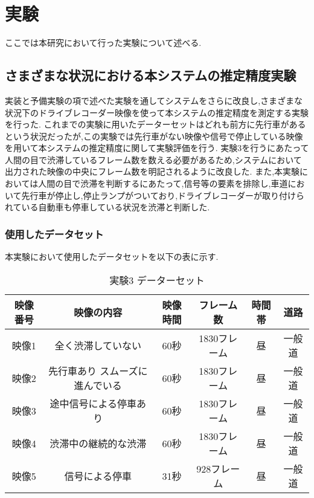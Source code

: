 \chapter{実験}
ここでは本研究において行った実験について述べる.

\section{さまざまな状況における本システムの推定精度実験}
実装と予備実験の項で述べた実験を通してシステムをさらに改良し,さまざまな状況下のドライブレコーダー映像を使って本システムの推定精度を測定する実験を行った.
これまでの実験に用いたデーターセットはどれも前方に先行車があるという状況だったが,この実験では先行車がない映像や信号で停止している映像を用いて本システムの推定精度に関して実験評価を行う.
実験3を行うにあたって人間の目で渋滞しているフレーム数を数える必要があるため,システムにおいて出力された映像の中央にフレーム数を明記されるように改良した.
また,本実験においては人間の目で渋滞を判断するにあたって,信号等の要素を排除し,車道において先行車が停止し,停止ランプがついており,ドライブレコーダーが取り付けられている自動車も停車している状況を渋滞と判断した.
%
%
%

\subsection{使用したデータセット}
本実験において使用したデータセットを以下の表に示す.

\begin{table}[htbp]
  \centering
  \begin{scriptsize}
  \begin{tabular}{cccccc}
  \toprule
映像番号 & 映像の内容 & 映像時間 & フレーム数 & 時間帯 & 道路 \\
  \midrule
映像1 & 全く渋滞していない & 60秒 & 1830フレーム & 昼 & 一般道 \\
映像2 & 先行車あり スムーズに進んでいる & 60秒 & 1830フレーム & 昼 & 一般道 \\
映像3 & 途中信号による停車あり & 60秒 & 1830フレーム & 昼 & 一般道 \\
映像4 & 渋滞中の継続的な渋滞 & 60秒 & 1830フレーム & 昼 & 一般道 \\
映像5 & 信号による停車 & 31秒& 928フレーム & 昼 & 一般道 \\
  \bottomrule
  \end{tabular}
  \end{scriptsize}
  \caption{実験3 データーセット}
  \label{tab:exp_dataset3}
\end{table}


